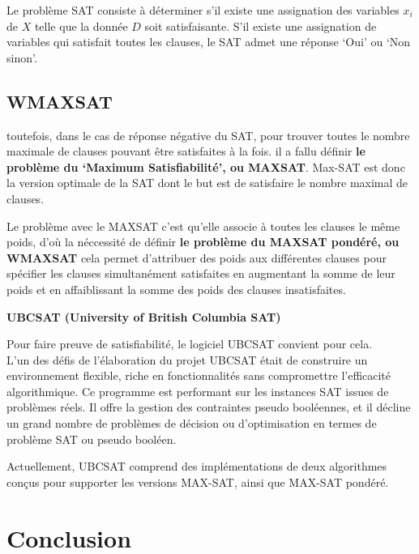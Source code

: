 Le problème SAT consiste à déterminer s’il existe une assignation des variables $x_i$ de $X$ telle que la donnée $D$ soit satisfaisante. S’il existe une assignation de variables qui satisfait toutes les clauses, le SAT admet une réponse ‘Oui’ ou ‘Non sinon’. 
\subsection{WMAXSAT}

toutefois, dans le cas de réponse négative du SAT, pour trouver toutes le nombre maximale de clauses pouvant être satisfaites à la fois. il a fallu définir \textbf{le problème du ‘Maximum Satisfiabilité’, ou MAXSAT}. Max-SAT est donc la version optimale de la SAT dont le but est de satisfaire le nombre maximal de clauses.

Le problème avec le MAXSAT c’est qu’elle associe à toutes les clauses le même poids, d’où la néccessité de définir \textbf{le problème du MAXSAT pondéré, ou WMAXSAT} cela permet d'attribuer des poids aux différentes clauses pour spécifier les clauses simultanément satisfaites en augmentant la somme de leur poids et en affaiblissant la somme des poids des clauses insatisfaites.


\textbf{UBCSAT (University of British Columbia SAT)}

Pour faire preuve de satisfiabilité, le logiciel UBCSAT convient pour cela.\\
L'un des défis de l'élaboration du projet UBCSAT était de construire un environnement flexible, riche en fonctionnalités sans compromettre l'efficacité algorithmique. Ce programme est performant sur les instances SAT issues de problèmes réels. Il offre la gestion des contraintes pseudo booléennes, et il décline un grand nombre de problèmes de décision ou d’optimisation en termes de problème SAT ou pseudo booléen.    

Actuellement, UBCSAT comprend des implémentations de deux algorithmes conçus pour supporter les versions MAX-SAT, ainsi que MAX-SAT pondéré.

{}
\section*{Conclusion}
